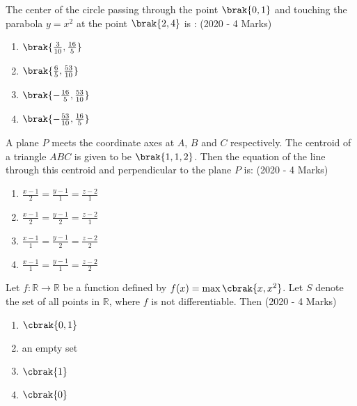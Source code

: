    \item{
	
			The center of the circle passing through the point $\brak{0,1}$ and touching the parabola $y=x^2$ at the point $\brak{2,4}$ is :
			\text{   }\hfill
			{(2020 - 4 Marks)}
			\begin{multicols}{4}
				\begin{enumerate}
					\item $\brak{\frac{3}{10}, \frac{16}{5}}$
					\item $\brak{\frac{6}{5}, \frac{53}{10}}$
					\item $\brak{-\frac{16}{5}, \frac{53}{10}}$
					\item $\brak{-\frac{53}{10}, \frac{16}{5}}$
				\end{enumerate}
			\end{multicols}
			
		}
    \item{
	
			A plane $P$ meets the coordinate axes at $A$, $B$ and $C$ respectively. The centroid of a triangle $ABC$ is given to be $\brak{1,1,2}$. Then the equation of the line through this centroid and perpendicular to the plane $P$ is:
			\text{   }\hfill
			{(2020 - 4 Marks)}
			\begin{multicols}{2}
				\begin{enumerate}
					\item $\frac{x-1}{2} = \frac{y-1}{1} = \frac{z-2}{1}$
					
					\item $\frac{x-1}{2} = \frac{y-1}{2} = \frac{z-2}{1}$
					
					\item $\frac{x-1}{1} = \frac{y-1}{2} = \frac{z-2}{2}$
					
					\item $\frac{x-1}{1} = \frac{y-1}{1} = \frac{z-2}{2}$
				\end{enumerate}
			\end{multicols}
			
		}
    \item{
        
            Let $f : \mathbb{R}\rightarrow \mathbb{R}$ be a function defined by $f(x) = \max \cbrak{x,x^2}$. Let $S$ denote the set of all points in $\mathbb{R}$, where $f$ is not differentiable. Then
             \hfill
              {(2020 - 4 Marks)}
              \begin{multicols}{2}
              	\begin{enumerate}
              		\item $\cbrak{0,1}$
              		\item an empty set
              		\item $\cbrak{1}$
              		\item $\cbrak{0}$
              	\end{enumerate}
              \end{multicols}
        
        }



